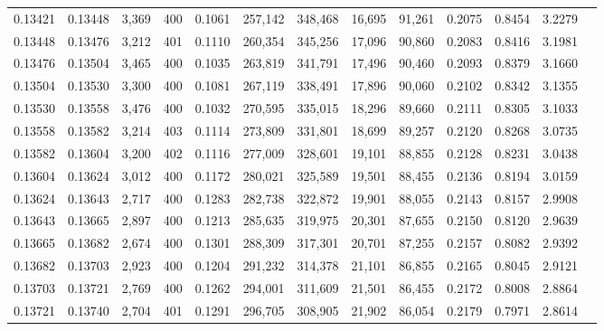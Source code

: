 \begin{tabular}{rrrrrrrrrrrrr}
0.13421 & 0.13448 &  3,369 &   400 &                                     0.1061 & 257,142 & 348,468 &  16,695 &  91,261 & 0.2075 & 0.8454 & 3.2279 \\
0.13448 & 0.13476 &  3,212 &   401 &                                     0.1110 & 260,354 & 345,256 &  17,096 &  90,860 & 0.2083 & 0.8416 & 3.1981 \\
0.13476 & 0.13504 &  3,465 &   400 &                                     0.1035 & 263,819 & 341,791 &  17,496 &  90,460 & 0.2093 & 0.8379 & 3.1660 \\
0.13504 & 0.13530 &  3,300 &   400 &                                     0.1081 & 267,119 & 338,491 &  17,896 &  90,060 & 0.2102 & 0.8342 & 3.1355 \\
0.13530 & 0.13558 &  3,476 &   400 &                                     0.1032 & 270,595 & 335,015 &  18,296 &  89,660 & 0.2111 & 0.8305 & 3.1033 \\
0.13558 & 0.13582 &  3,214 &   403 &                                     0.1114 & 273,809 & 331,801 &  18,699 &  89,257 & 0.2120 & 0.8268 & 3.0735 \\
0.13582 & 0.13604 &  3,200 &   402 &                                     0.1116 & 277,009 & 328,601 &  19,101 &  88,855 & 0.2128 & 0.8231 & 3.0438 \\
0.13604 & 0.13624 &  3,012 &   400 &                                     0.1172 & 280,021 & 325,589 &  19,501 &  88,455 & 0.2136 & 0.8194 & 3.0159 \\
0.13624 & 0.13643 &  2,717 &   400 &                                     0.1283 & 282,738 & 322,872 &  19,901 &  88,055 & 0.2143 & 0.8157 & 2.9908 \\
0.13643 & 0.13665 &  2,897 &   400 &                                     0.1213 & 285,635 & 319,975 &  20,301 &  87,655 & 0.2150 & 0.8120 & 2.9639 \\
0.13665 & 0.13682 &  2,674 &   400 &                                     0.1301 & 288,309 & 317,301 &  20,701 &  87,255 & 0.2157 & 0.8082 & 2.9392 \\
0.13682 & 0.13703 &  2,923 &   400 &                                     0.1204 & 291,232 & 314,378 &  21,101 &  86,855 & 0.2165 & 0.8045 & 2.9121 \\
0.13703 & 0.13721 &  2,769 &   400 &                                     0.1262 & 294,001 & 311,609 &  21,501 &  86,455 & 0.2172 & 0.8008 & 2.8864 \\
0.13721 & 0.13740 &  2,704 &   401 &                                     0.1291 & 296,705 & 308,905 &  21,902 &  86,054 & 0.2179 & 0.7971 & 2.8614 \\

\end{tabular}

